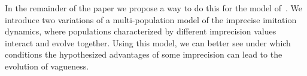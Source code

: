 \documentclass[a4paper]{article}
\begin{document}
%
In the remainder of the paper we propose a way to do this for the model of~\textcite{franke_vagueness_2017}.
We introduce two variations of a multi-population model of the imprecise imitation dynamics, where populations characterized by different imprecision values interact and evolve together.
Using this model, we can better see under which conditions the hypothesized advantages of some imprecision can lead to the evolution of vagueness.

\end{document}
